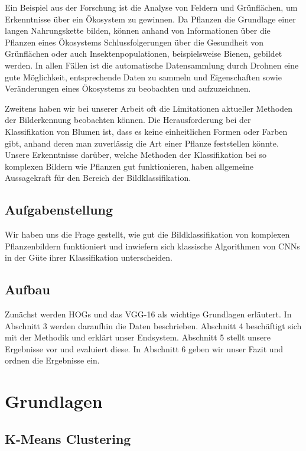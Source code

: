 \documentclass[11pt,a4paper]{article}
\begin{document}
Ein Beispiel aus der Forschung ist die Analyse von Feldern und Grünflächen, um Erkenntnisse über ein Ökosystem zu gewinnen. Da Pflanzen die Grundlage einer langen Nahrungskette bilden, können anhand von Informationen über die Pflanzen eines Ökosystems Schlussfolgerungen über die Gesundheit von Grünflächen oder auch Insektenpopulationen, beispielsweise Bienen, gebildet werden. In allen Fällen ist die automatische Datensammlung durch Drohnen eine gute Möglichkeit, entsprechende Daten zu sammeln und Eigenschaften sowie Veränderungen eines Ökosystems zu beobachten und aufzuzeichnen.

Zweitens haben wir bei unserer Arbeit oft die Limitationen aktueller Methoden der Bilderkennung beobachten können. Die Herausforderung bei der Klassifikation von Blumen ist, dass es keine einheitlichen Formen oder Farben gibt, anhand deren man zuverlässig die Art einer Pflanze feststellen könnte. Unsere Erkenntnisse darüber, welche Methoden der Klassifikation bei so komplexen Bildern wie Pflanzen gut funktionieren, haben allgemeine Aussagekraft für den Bereich der Bildklassifikation.

\subsection{Aufgabenstellung}
Wir haben uns die Frage gestellt, wie gut die Bildklassifikation von komplexen Pflanzenbildern funktioniert und inwiefern sich klassische Algorithmen von CNNs in der Güte ihrer Klassifikation unterscheiden.

\subsection{Aufbau}
Zunächst werden HOGs und das VGG-16 als wichtige Grundlagen erläutert. In Abschnitt 3 werden daraufhin die Daten beschrieben. Abschnitt 4 be\-schäf\-tigt sich mit der Methodik und erklärt unser Endsystem. Abschnitt 5 stellt unsere Ergebnisse vor und evaluiert diese. In Abschnitt 6 geben wir unser Fazit und ordnen die Ergebnisse ein.

\section{Grundlagen}

\subsection{K-Means Clustering}
\label{subsec:KMeans_Basics}
\end{document}
